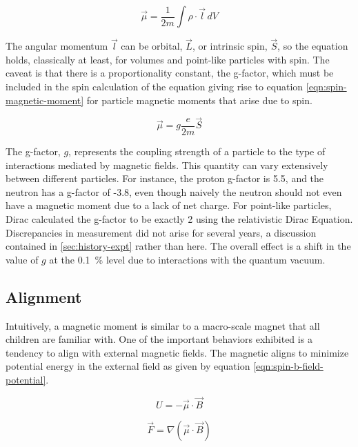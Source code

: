 \begin{equation}
\label{eqn:magnetic-moment-integral-2}
\vec{\mu} = \frac{1}{2 m} \int \rho \cdot \vec{l} \,dV
\end{equation}

The angular momentum $\vec{l}$ can be orbital, $\vec{L}$, or intrinsic spin, $\vec{S}$, so the equation holds, classically at least, for volumes and point-like particles with spin. The caveat is that there is a proportionality constant, the g-factor, which must be included in the spin calculation of the equation giving rise to equation \ref{eqn:spin-magnetic-moment} for particle magnetic moments that arise due to spin.

\begin{equation}
\label{eqn:spin-magnetic-moment}
\vec{\mu} = g \frac{e}{2m}\vec{S}
\end{equation}

\noindent
The g-factor, $g$, represents the coupling strength of a particle to the type of interactions mediated by magnetic fields.  This quantity can vary extensively between different particles.  For instance, the proton g-factor is 5.5, and the neutron has a g-factor of -3.8\cite{codata}, even though naively the neutron should not even have a magnetic moment due to a lack of net charge.  For point-like particles, Dirac calculated the g-factor to be exactly 2 using the relativistic Dirac Equation.  Discrepancies in measurement did not arise for several years, a discussion contained in \ref{sec:history-expt} rather than here.  The overall effect is a shift in the value of $g$ at the \SI{0.1}{\percent} level due to interactions with the quantum vacuum.

\subsection{Alignment}
Intuitively, a magnetic moment is similar to a macro-scale magnet that all children are familiar with.  One of the important behaviors exhibited is a tendency to align with external magnetic fields.  The magnetic aligns to minimize potential energy in the external field as given by equation \ref{eqn:spin-b-field-potential}.

\begin{equation}
\label{eqn:spin-b-field-potential}
U = -\vec{\mu} \cdot \vec{B}
\end{equation}

\begin{equation}
\label{eqn:spin-b-field-force}
\vec{F} = \nabla (\vec{\mu} \cdot \vec{B})
\end{equation}

